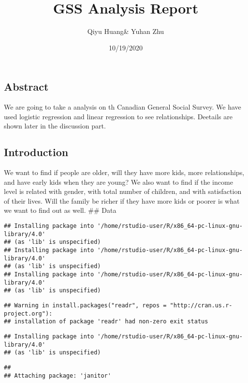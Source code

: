 \documentclass[
]{article}
\title{GSS Analysis Report}
\author{Qiyu Huang\& Yuhan Zhu}
\date{10/19/2020}
\begin{document}
\maketitle

\hypertarget{abstract}{%
\subsection{Abstract}\label{abstract}}

We are going to take a analysis on th Canadian General Social Survey. We
have used logistic regression and linear regression to see
relationships. Deetails are shown later in the discussion part.

\hypertarget{introduction}{%
\subsection{Introduction}\label{introduction}}

We want to find if people are older, will they have more kids, more
relationships, and have early kids when they are young? We also want to
find if the income level is related with gender, with total number of
children, and with satisfaction of their lives. Will the family be
richer if they have more kids or poorer is what we want to find out as
well. \#\# Data

\begin{verbatim}
## Installing package into '/home/rstudio-user/R/x86_64-pc-linux-gnu-library/4.0'
## (as 'lib' is unspecified)
## Installing package into '/home/rstudio-user/R/x86_64-pc-linux-gnu-library/4.0'
## (as 'lib' is unspecified)
## Installing package into '/home/rstudio-user/R/x86_64-pc-linux-gnu-library/4.0'
## (as 'lib' is unspecified)
\end{verbatim}

\begin{verbatim}
## Warning in install.packages("readr", repos = "http://cran.us.r-project.org"):
## installation of package 'readr' had non-zero exit status
\end{verbatim}

\begin{verbatim}
## Installing package into '/home/rstudio-user/R/x86_64-pc-linux-gnu-library/4.0'
## (as 'lib' is unspecified)
\end{verbatim}

\begin{verbatim}
## 
## Attaching package: 'janitor'
\end{verbatim}
\end{document}
